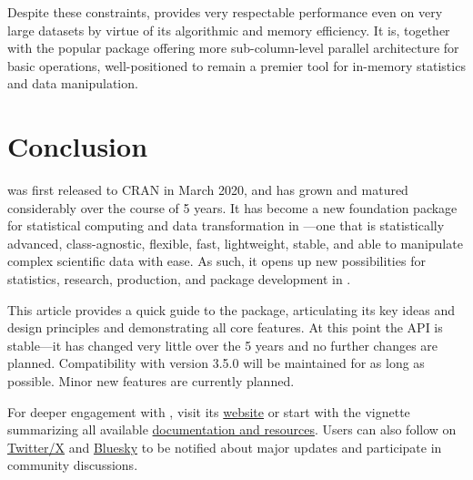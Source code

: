 \documentclass[nojss]{jss} %
\begin{document}
Despite these constraints,  provides very respectable performance even on very large datasets by virtue of its algorithmic and memory efficiency. It is, together with the popular  package offering more sub-column-level parallel architecture for basic operations, well-positioned to remain a premier tool for in-memory statistics and data manipulation. %


\section{Conclusion} \label{sec:conclusion}

 was first released to CRAN in March 2020, and has grown and matured considerably over the course of 5 years. It has become a new foundation package for statistical computing and data transformation in ---one that is statistically advanced, class-agnostic, flexible, fast, lightweight, stable, and able to manipulate complex scientific data with ease. As such, it opens up new possibilities for statistics, research, production, and package development in . \newline %

This article provides a quick guide to the package, articulating its key ideas and design principles and demonstrating all core features. At this point the API is stable---it has changed very little over the 5 years and no further changes are planned. Compatibility with  version 3.5.0 will be maintained for as long as possible. Minor new features are currently planned. \newline

For deeper engagement with , visit its \href{https://sebkrantz.github.io/collapse/index.html}{website} or start with the vignette summarizing all available \href{https://sebkrantz.github.io/collapse/articles/collapse_documentation.html}{documentation and resources}. Users can also follow  on \href{https://x.com/collapse_R}{Twitter/X} and \href{https://bsky.app/profile/rcollapse.bsky.social}{Bluesky} to be notified about major updates and participate in community discussions. \newline
\end{document}
